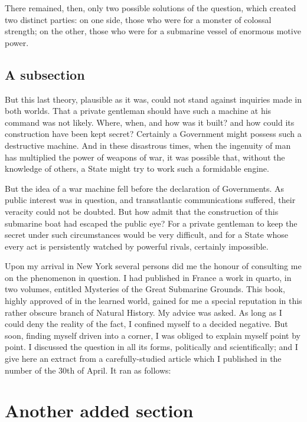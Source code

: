 There remained, then, only two possible solutions of the question,
which created two distinct parties:  on one side, those who were
for a monster of colossal strength; on the other, those who were
for a submarine vessel of enormous motive power.

\subsection{A subsection}

But this last theory, plausible as it was, could not stand against
inquiries made in both worlds.  That a private gentleman should have
such a machine at his command was not likely.  Where, when, and how
was it built? and how could its construction have been kept secret?
Certainly a Government might possess such a destructive machine.
And in these disastrous times, when the ingenuity of man has
multiplied the power of weapons of war, it was possible that,
without the knowledge of others, a State might try to work such
a formidable engine.

But the idea of a war machine fell before the declaration of Governments.
As public interest was in question, and transatlantic communications
suffered, their veracity could not be doubted.  But how admit that
the construction of this submarine boat had escaped the public eye?
For a private gentleman to keep the secret under such circumstances would
be very difficult, and for a State whose every act is persistently watched
by powerful rivals, certainly impossible.


Upon my arrival in New York several persons did me
the honour of consulting me on the phenomenon in question.
I had published in France a work in quarto, in two volumes,
entitled Mysteries of the Great Submarine Grounds.  This book,
highly approved of in the learned world, gained for me a special
reputation in this rather obscure branch of Natural History.
My advice was asked.  As long as I could deny the reality
of the fact, I confined myself to a decided negative.
But soon, finding myself driven into a corner, I was
obliged to explain myself point by point.  I discussed
the question in all its forms, politically and scientifically;
and I give here an extract from a carefully-studied article
which I published in the number of the 30th of April.
It ran as follows:

\section{Another added section}


